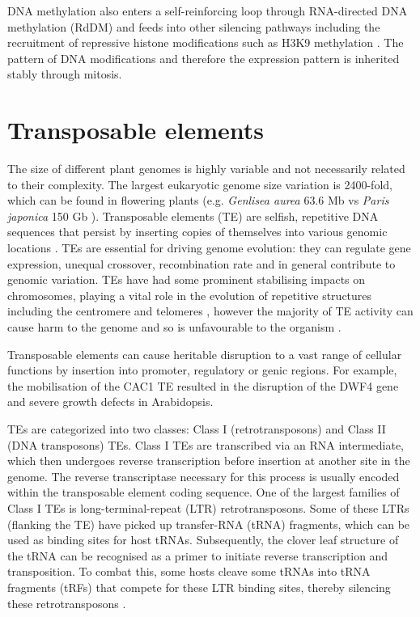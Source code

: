 DNA methylation also enters a self-reinforcing loop through RNA-directed DNA methylation (RdDM) and feeds into other silencing pathways including the recruitment of repressive histone modifications such as H3K9 methylation \citep{RN206,RN98,RN99}. The pattern of DNA modifications and therefore the expression pattern is inherited stably through mitosis. 

\section{Transposable elements} %

The size of different plant genomes is highly variable and not necessarily related to their complexity. The largest eukaryotic genome size variation is 2400-fold, which can be found in flowering plants (e.g. \textit{Genlisea aurea}  63.6 Mb vs \textit{Paris japonica} 150 Gb \citep{RN76,RN81}). Transposable elements (TE) are selfish, repetitive DNA sequences that persist by inserting copies of themselves into various genomic locations \citep{RN102}. TEs are essential for driving genome evolution:  they can regulate gene expression, unequal crossover, recombination rate and in general contribute to genomic variation. TEs have had some prominent stabilising impacts on  chromosomes, playing a vital role in the evolution  of repetitive structures including the centromere  and telomeres \citep{RN101}, however the majority of TE  activity can cause harm to the genome and so is unfavourable to the organism \citep{RN103}.

Transposable elements can cause heritable disruption to a vast range of cellular functions by insertion into promoter, regulatory or genic regions. For example, the mobilisation of the CAC1 TE resulted in the disruption of the DWF4 gene and severe growth defects in Arabidopsis.

TEs are categorized into two classes: Class I (retrotransposons) and Class II (DNA transposons) TEs. Class I TEs are transcribed via an RNA intermediate, which then undergoes reverse transcription before insertion at another site in the genome. The reverse transcriptase necessary for this process is usually encoded within the transposable element coding sequence. One of the largest families of Class I TEs is long-terminal-repeat (LTR) retrotransposons. Some of these LTRs (flanking the TE) have picked up transfer-RNA (tRNA) fragments, which can be used as binding sites for host tRNAs. Subsequently, the clover leaf structure of the tRNA can be recognised as a primer to initiate reverse transcription and transposition. To combat this, some hosts cleave some tRNAs into tRNA fragments (tRFs) that compete for these LTR binding sites, thereby silencing these retrotransposons \citep{RN66,RN67,RN68}.

